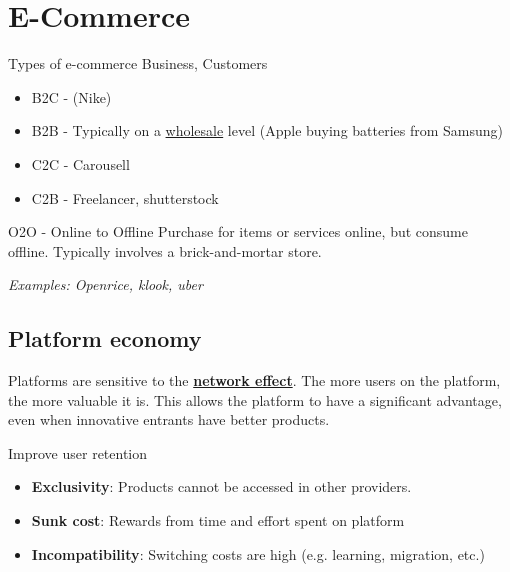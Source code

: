 \section{E-Commerce}

\begin{definition}
    {Types of e-commerce}
    Business, Customers
    \begin{itemize}
        \item B2C - (Nike)
        \item B2B - Typically on a \underline{wholesale} level (Apple buying batteries from Samsung)
        \item C2C - Carousell
        \item C2B - Freelancer, shutterstock
    \end{itemize}
\end{definition}

\begin{knBox}
    {O2O - Online to Offline}
    Purchase for items or services online, but consume offline. Typically involves a brick-and-mortar store.

    \textit{Examples: Openrice, klook, uber}
\end{knBox}

\subsection{Platform economy}
\label{subsec:platform}

Platforms are sensitive to the \hyperref[def:network]{\textbf{network effect}}. The more users on the platform, the more valuable it is. This allows the platform to have a significant advantage, even when innovative entrants have better products.

\begin{knBox}
    {Improve user retention}
    \begin{itemize}
        \item \textbf{Exclusivity}: Products cannot be accessed in other providers.
        \item \textbf{Sunk cost}: Rewards from time and effort spent on platform
        \item \textbf{Incompatibility}: Switching costs are high (e.g. learning, migration, etc.)
    \end{itemize}
\end{knBox}